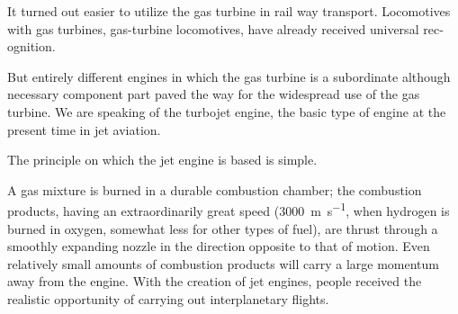 It turned out easier to utilize the gas turbine in rail­ way transport. Locomotives with gas turbines, gas-tur­bine locomotives, have already received universal rec­ognition.

But entirely different engines in which the gas turbine is a subordinate although necessary component part paved the way for the widespread use of the gas turbine. We are speaking of the turbojet engine, the basic type of
engine at the present time in jet aviation.

The principle on which the jet engine is based is simple.

A gas mixture is burned in a durable combustion cham­ber; the combustion products, having an extraordinarily great speed (\SI{3000}{\meter\per\second}, when hydrogen is burned in oxy­gen, somewhat less for other types of fuel), are thrust through a smoothly expanding nozzle in the direction op­posite to that of motion. Even relatively small amounts of combustion products will carry a large momentum away from the engine.
With the creation of jet engines, people received the realistic opportunity of carrying out interplanetary flights.

